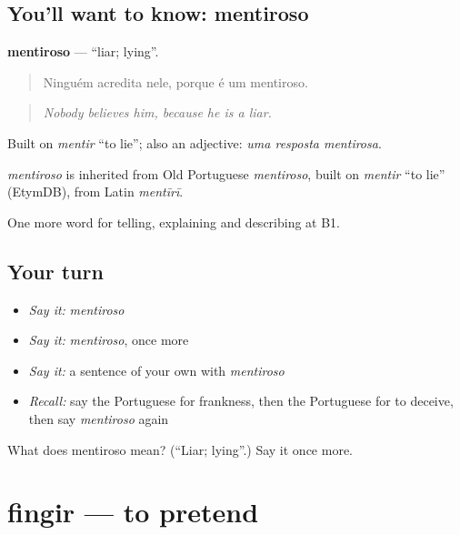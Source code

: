 \subsection*{You'll want to know: mentiroso}
\textbf{mentiroso} — \textquotedblleft{}liar; lying\textquotedblright{}.

\begin{quote}
Ninguém acredita nele, porque é um mentiroso.
\end{quote}

\begin{quote}
\emph{Nobody believes him, because he is a liar.}
\end{quote}

Built on \emph{mentir} \textquotedblleft{}to lie\textquotedblright{}; also an adjective: \emph{uma resposta mentirosa}.

\begin{cousinweb}
\emph{mentiroso} is inherited from Old Portuguese \emph{mentiroso}, built on \emph{mentir} \textquotedblleft{}to lie\textquotedblright{} (EtymDB), from Latin \emph{mentīrī}.
\end{cousinweb}

\begin{grammarlens}[title={What you've built}]
One more word for telling, explaining and describing at B1.
\end{grammarlens}

\subsection*{Your turn}
\begin{itemize}
\raggedright
  \item \emph{Say it:} \emph{mentiroso}
  \item \emph{Say it:} \emph{mentiroso}, once more
  \item \emph{Say it:} a sentence of your own with \emph{mentiroso}
  \item \emph{Recall:} say the Portuguese for frankness, then the Portuguese for to deceive, then say \emph{mentiroso} again
\end{itemize}

\begin{tcolorbox}[breakable,colback=teal!4,colframe=teal!35!black,title={Before you move on}]
What does mentiroso mean? (\textquotedblleft{}Liar; lying\textquotedblright{}.) Say it once more.
\end{tcolorbox}
\section[fingir]{fingir — to pretend}

